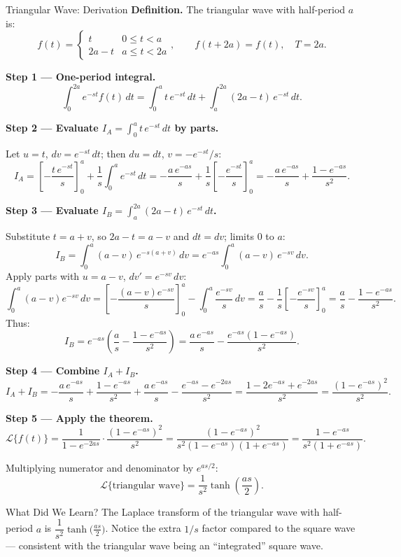 \documentclass[12pt,a4paper]{article}
\begin{document}
\begin{infobox}{Triangular Wave: Derivation}
\textbf{Definition.}  The triangular wave with half-period $a$ is:
\[
  f(t) =
  \begin{cases}
    t     & 0 \leq t < a \\
    2a-t  & a \leq t < 2a
  \end{cases}, \qquad f(t+2a) = f(t), \quad T = 2a.
\]

\textbf{Step 1 --- One-period integral.}
\[
  \int_0^{2a} e^{-st} f(t)\,dt
  = \int_0^a t\,e^{-st}\,dt + \int_a^{2a}(2a-t)\,e^{-st}\,dt.
\]

\textbf{Step 2 --- Evaluate $I_A = \int_0^a t\,e^{-st}\,dt$ by parts.}

Let $u = t$, $dv = e^{-st}\,dt$; then $du = dt$, $v = -e^{-st}/s$:
\[
  I_A
  = \left[-\frac{t\,e^{-st}}{s}\right]_0^a + \frac{1}{s}\int_0^a e^{-st}\,dt
  = -\frac{a\,e^{-as}}{s} + \frac{1}{s}\left[-\frac{e^{-st}}{s}\right]_0^a
  = -\frac{a\,e^{-as}}{s} + \frac{1-e^{-as}}{s^2}.
\]

\textbf{Step 3 --- Evaluate $I_B = \int_a^{2a}(2a-t)\,e^{-st}\,dt$.}

Substitute $t = a + v$, so $2a - t = a - v$ and $dt = dv$; limits $0$ to $a$:
\[
  I_B = \int_0^a (a-v)\,e^{-s(a+v)}\,dv
      = e^{-as}\int_0^a (a-v)\,e^{-sv}\,dv.
\]
Apply parts with $u = a-v$, $dv' = e^{-sv}\,dv$:
\[
  \int_0^a (a-v)e^{-sv}\,dv
  = \left[-\frac{(a-v)e^{-sv}}{s}\right]_0^a - \int_0^a \frac{e^{-sv}}{s}\,dv
  = \frac{a}{s} - \frac{1}{s}\left[-\frac{e^{-sv}}{s}\right]_0^a
  = \frac{a}{s} - \frac{1-e^{-as}}{s^2}.
\]
Thus:
\[
  I_B = e^{-as}\left(\frac{a}{s} - \frac{1-e^{-as}}{s^2}\right)
      = \frac{a\,e^{-as}}{s} - \frac{e^{-as}(1-e^{-as})}{s^2}.
\]

\textbf{Step 4 --- Combine $I_A + I_B$.}
\[
  I_A + I_B
  = -\frac{a\,e^{-as}}{s} + \frac{1-e^{-as}}{s^2}
  + \frac{a\,e^{-as}}{s} - \frac{e^{-as}-e^{-2as}}{s^2}
  = \frac{1 - 2e^{-as} + e^{-2as}}{s^2}
  = \frac{(1-e^{-as})^2}{s^2}.
\]

\textbf{Step 5 --- Apply the theorem.}
\[
  \mathcal{L}\{f(t)\}
  = \frac{1}{1-e^{-2as}} \cdot \frac{(1-e^{-as})^2}{s^2}
  = \frac{(1-e^{-as})^2}{s^2(1-e^{-as})(1+e^{-as})}
  = \frac{1-e^{-as}}{s^2(1+e^{-as})}.
\]

Multiplying numerator and denominator by $e^{as/2}$:
\[
  \boxed{\mathcal{L}\{\text{triangular wave}\}
  = \frac{1}{s^2}\tanh\!\left(\frac{as}{2}\right).}
\]
\end{infobox}

\begin{learnbox}{What Did We Learn?}
The Laplace transform of the triangular wave with half-period $a$ is
$\dfrac{1}{s^2}\tanh\!\bigl(\tfrac{as}{2}\bigr)$.  Notice the extra $1/s$
factor compared to the square wave --- consistent with the triangular wave
being an ``integrated'' square wave.
\end{learnbox}
\end{document}
